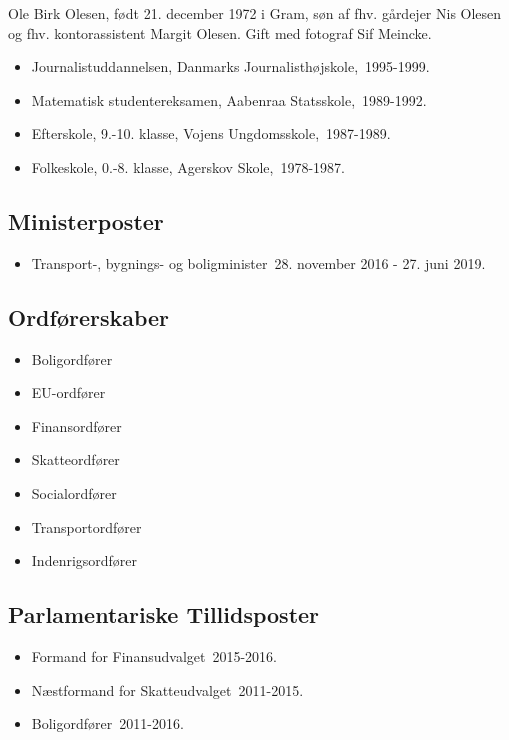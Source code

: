 \documentclass[11pt, a4paper]{awesome-cv}
\begin{document}
\makecvheader[R]
\makelettertitle
\begin{cvletter}
Ole Birk Olesen, født 21. december 1972 i Gram, søn af fhv. gårdejer Nis Olesen og fhv. kontorassistent Margit Olesen. Gift med fotograf Sif Meincke.

\begin{itemize}
\item Journalistuddannelsen, Danmarks Journalisthøjskole, 1995-1999.
\item Matematisk studentereksamen, Aabenraa Statsskole, 1989-1992.
\item Efterskole, 9.-10. klasse, Vojens Ungdomsskole, 1987-1989.
\item Folkeskole, 0.-8. klasse, Agerskov Skole, 1978-1987.
\end{itemize}
\subsection*{Ministerposter}
\begin{itemize}
\item Transport-, bygnings- og boligminister 28. november 2016 - 27. juni 2019.
\end{itemize}
\subsection*{Ordførerskaber}
\begin{itemize}
\item Boligordfører
\item EU-ordfører
\item Finansordfører
\item Skatteordfører
\item Socialordfører
\item Transportordfører
\item Indenrigsordfører
\end{itemize}
\subsection*{Parlamentariske Tillidsposter}
\begin{itemize}
\item Formand for Finansudvalget 2015-2016.
\item Næstformand for Skatteudvalget 2011-2015.
\item Boligordfører 2011-2016.
\end{itemize}

\end{cvletter}
\end{document}
